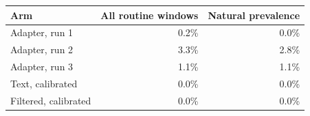 \begin{tabular}{lrr}
\toprule
Arm & All routine windows & Natural prevalence \\
\midrule
Adapter, run 1 & 0.2\% & 0.0\% \\
Adapter, run 2 & 3.3\% & 2.8\% \\
Adapter, run 3 & 1.1\% & 1.1\% \\
Text, calibrated & 0.0\% & 0.0\% \\
Filtered, calibrated & 0.0\% & 0.0\% \\
\bottomrule
\end{tabular}
